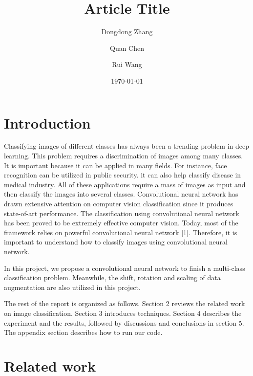 \documentclass[twoside,twocolumn]{article}
\title{Article Title} %
\author[1]{Dongdong Zhang}
\author[2]{Quan Chen}
\author[3]{Rui Wang}
\affil[1,2,3]{University of Sydney}
{	
    \makeatletter
    \renewcommand\AB@affilsepx{: \protect\Affilfont}
    \makeatother

    \affil[ ]{Student ID}

    \makeatletter
    \renewcommand\AB@affilsepx{, \protect\Affilfont}
    \makeatother

    \affil[1]{470161133}
    \affil[2]{470199228}
    \affil[3]{470208162}
}
\date{\today} %
\begin{document}
\maketitle


\section{Introduction}

\lettrine[nindent=0em,lines=3]{C}{}lassifying images of different classes has always been a trending problem in deep learning. This problem requires a discrimination of images among many classes. It is important because it can be applied in many fields. For instance, face recognition can be utilized in public security. it can also help classify disease in medical industry. All of these applications require a mass of images as input and then classify the images into several classes. Convolutional neural network has drawn extensive attention on computer vision classification since it produces state-of-art performance. The classification using convolutional neural network has been proved to be extremely effective computer vision. Today, most of the framework relies on powerful convolutional neural network [1]. Therefore, it is important to understand how to classify images using convolutional neural network. 


In this project, we propose a convolutional neural network to finish a multi-class classification problem. Meanwhile, the shift, rotation and scaling of data augmentation are also utilized in this project.

The rest of the report is organized as follows. Section 2 reviews the related work on image classification. Section 3 introduces techniques. Section 4 describes the experiment and the results, followed by discussions and conclusions in section 5. The appendix section describes how to run our code. 


\section{Related work}
\end{document}
